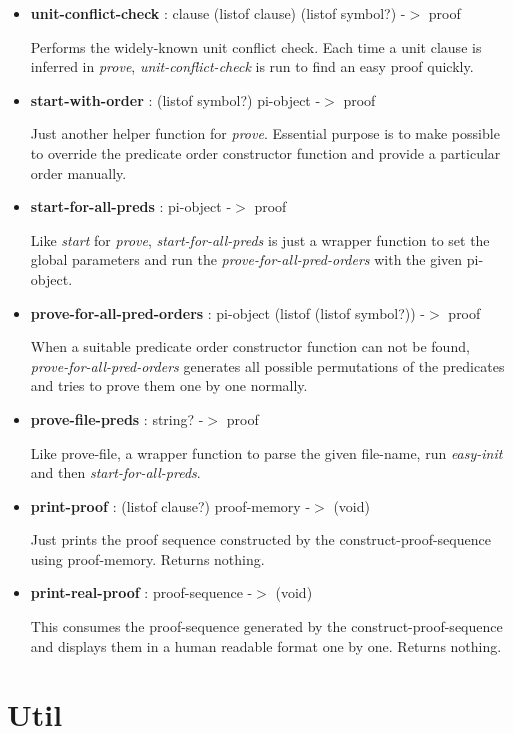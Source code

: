 \documentclass[11pt]{report}
\begin{document}
\begin{appendices}
\begin{itemize}
 \item \textbf{unit-conflict-check} : clause (listof clause) (listof symbol?) -$>$ proof

Performs the widely-known unit conflict check. Each time a unit clause is inferred in \textit{prove}, \textit{unit-conflict-check} is run to find an easy proof quickly. 

 \item \textbf{start-with-order} : (listof symbol?) pi-object -$>$ proof

Just another helper function for \textit{prove}. Essential purpose is to make possible to override the predicate order constructor function and provide a particular order manually.

 \item \textbf{start-for-all-preds} : pi-object -$>$ proof

Like \textit{start} for \textit{prove}, \textit{start-for-all-preds} is just a wrapper function to set the global parameters and run the \textit{prove-for-all-pred-orders} with the given pi-object.

 \item \textbf{prove-for-all-pred-orders} : pi-object (listof (listof symbol?)) -$>$ proof

When a suitable predicate order constructor function can not be found, \textit{prove-for-all-pred-orders} generates all possible permutations of the predicates and tries to prove them one by one normally.

 \item \textbf{prove-file-preds} : string? -$>$ proof

Like prove-file, a wrapper function to parse the given file-name, run \textit{easy-init} and then \textit{start-for-all-preds}.

 \item \textbf{print-proof} : (listof clause?) proof-memory -$>$ (void)

Just prints the proof sequence constructed by the construct-proof-sequence using proof-memory. Returns nothing.

 \item \textbf{print-real-proof} : proof-sequence -$>$ (void)

This consumes the proof-sequence generated by the construct-proof-sequence and displays them in a human readable format one by one. Returns nothing.

\end{itemize}

\section{Util}


\end{appendices}
\end{document}
